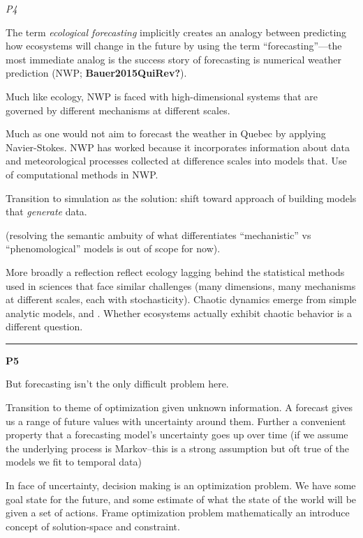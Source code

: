 \documentclass[10pt,oneside]{article}
\begin{document}
\emph{P4}

The term \emph{ecological forecasting} implicitly creates an analogy
between predicting how ecosystems will change in the future by using the
term ``forecasting''---the most immediate analog is the success story of
forecasting is numerical weather prediction (NWP;
\textbf{Bauer2015QuiRev?}).

Much like ecology, NWP is faced with high-dimensional systems that are
governed by different mechanisms at different scales.

Much as one would not aim to forecast the weather in Quebec by applying
Navier-Stokes. NWP has worked because it incorporates information about
data and meteorological processes collected at difference scales into
models that. Use of computational methods in NWP.

Transition to simulation as the solution: shift toward approach of
building models that \emph{generate} data.

(resolving the semantic ambuity of what differentiates ``mechanistic''
vs ``phenomological'' models is out of scope for now).

More broadly a reflection reflect ecology lagging behind the statistical
methods used in sciences that face similar challenges (many dimensions,
many mechanisms at different scales, each with stochasticity). Chaotic
dynamics emerge from simple analytic models, and . Whether ecosystems
actually exhibit chaotic behavior is a different question.

\begin{center}\rule{0.5\linewidth}{0.5pt}\end{center}

\textbf{P5}

But forecasting isn't the only difficult problem here.

Transition to theme of optimization given unknown information. A
forecast gives us a range of future values with uncertainty around them.
Further a convenient property that a forecasting model's uncertainty
goes up over time (if we assume the underlying process is Markov--this
is a strong assumption but oft true of the models we fit to temporal
data)

In face of uncertainty, decision making is an optimization problem. We
have some goal state for the future, and some estimate of what the state
of the world will be given a set of actions. Frame optimization problem
mathematically an introduce concept of solution-space and constraint.
\end{document}
